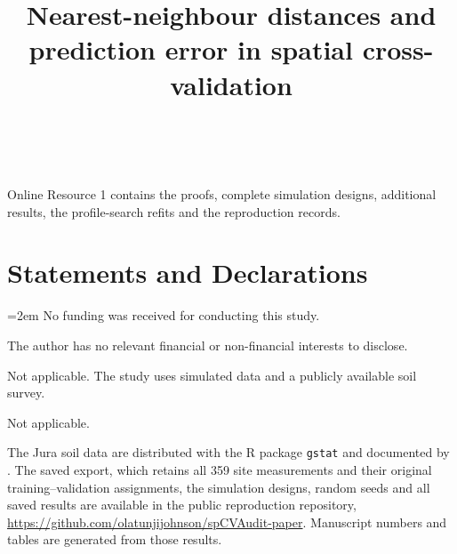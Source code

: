 \documentclass[pdflatex,sn-basic]{sn-jnl}
\begin{document}
\title[Nearest-neighbour distances and prediction error]{Nearest-neighbour distances and prediction error in spatial cross-validation}
\author*[1]{ \,}
\abstract{}
\maketitle





Online Resource 1 contains the proofs, complete simulation designs, additional results, the profile-search refits and the reproduction records.

\section*{Statements and Declarations}
\begingroup{}\emergencystretch=2em
No funding was received for conducting this study.

The author has no relevant financial or non-financial interests to disclose.

Not applicable. The study uses simulated data and a publicly available soil survey.

Not applicable.

The Jura soil data are distributed with the R package \texttt{gstat} and documented by \citet{goovaerts1997geostatistics}. The saved export, which retains all 359 site measurements and their original training--validation assignments, the simulation designs, random seeds and all saved results are available in the public reproduction repository, \url{https://github.com/olatunjijohnson/spCVAudit-paper}. Manuscript numbers and tables are generated from those results.
\end{document}
